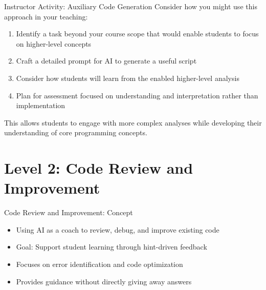 \documentclass[xcolor=dvipsnames, aspectratio=169]{beamer}
\begin{document}
\begin{frame}{Instructor Activity: Auxiliary Code Generation}
  Consider how you might use this approach in your teaching:
  
  \begin{enumerate}
    \item Identify a task beyond your course scope that would enable students to focus on higher-level concepts
    \item Craft a detailed prompt for AI to generate a useful script
    \item Consider how students will learn from the enabled higher-level analysis
    \item Plan for assessment focused on understanding and interpretation rather than implementation
  \end{enumerate}
  
  This allows students to engage with more complex analyses while developing their understanding of core programming concepts.
\end{frame}

\section{Level 2: Code Review and Improvement}

\begin{frame}{Code Review and Improvement: Concept}
  \begin{itemize}
    \item Using AI as a coach to review, debug, and improve existing code
    \item Goal: Support student learning through hint-driven feedback
    \item Focuses on error identification and code optimization
    \item Provides guidance without directly giving away answers
  \end{itemize}
\end{frame}
\end{document}
